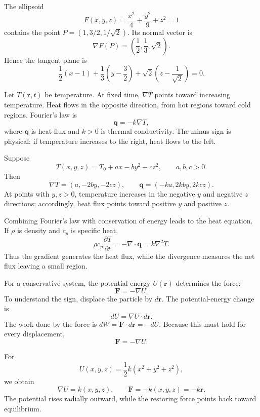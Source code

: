 \begin{bookexample}
The ellipsoid
\[
F(x,y,z)=\frac{x^2}{4}+\frac{y^2}{9}+z^2=1
\]
contains the point $P=(1,3/2,1/\sqrt2)$. Its normal vector is
\[
\nabla F(P)
=
\left(\frac12,\frac13,\sqrt2\right).
\]
Hence the tangent plane is
\[
\frac12(x-1)+\frac13\left(y-\frac32\right)
+\sqrt2\left(z-\frac{1}{\sqrt2}\right)=0.
\]
\end{bookexample}


Let $T(\mathbf r,t)$ be temperature. At fixed time, $\nabla T$ points toward increasing temperature. Heat flows in the opposite direction, from hot regions toward cold regions. Fourier's law is
\[
\boxed{\mathbf q=-k\nabla T,}
\]
where $\mathbf q$ is heat flux and $k>0$ is thermal conductivity. The minus sign is physical: if temperature increases to the right, heat flows to the left.

\begin{bookexample}
Suppose
\[
T(x,y,z)=T_0+ax-by^2-cz^2,
\qquad a,b,c>0.
\]
Then
\[
\nabla T=(a,-2by,-2cz),
\qquad
\mathbf q=(-ka,2kby,2kcz).
\]
At points with $y,z>0$, temperature increases in the negative $y$ and negative $z$ directions; accordingly, heat flux points toward positive $y$ and positive $z$.
\end{bookexample}

Combining Fourier's law with conservation of energy leads to the heat equation. If $\rho$ is density and $c_p$ is specific heat,
\[
\rho c_p\frac{\partial T}{\partial t}
=-\nabla\cdot\mathbf q
=k\nabla^2T.
\]
Thus the gradient generates the heat flux, while the divergence measures the net flux leaving a small region.


For a conservative system, the potential energy $U(\mathbf r)$ determines the force:
\[
\boxed{\mathbf F=-\nabla U.}
\]
To understand the sign, displace the particle by $d\mathbf r$. The potential-energy change is
\[
dU=\nabla U\cdot d\mathbf r.
\]
The work done by the force is $dW=\mathbf F\cdot d\mathbf r=-dU$. Because this must hold for every displacement,
\[
\mathbf F=-\nabla U.
\]

\begin{bookexample}
For
\[
U(x,y,z)=\frac12k(x^2+y^2+z^2),
\]
we obtain
\[
\nabla U=k(x,y,z),
\qquad
\mathbf F=-k(x,y,z)=-k\mathbf r.
\]
The potential rises radially outward, while the restoring force points back toward equilibrium.
\end{bookexample}

